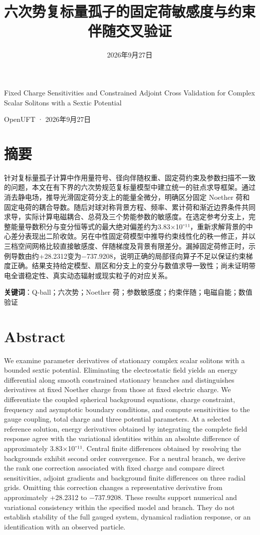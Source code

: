 \documentclass[UTF8,fontset=fandol,11pt]{ctexart}
\title{六次势复标量孤子的固定荷敏感度与约束伴随交叉验证}
\author{}
\date{2026年9月27日}
\begin{document}
\maketitle

Fixed Charge Sensitivities and Constrained Adjoint Cross Validation for Complex Scalar Solitons with a Sextic Potential

OpenUFT · 2026年9月27日

\section*{摘要}

针对复标量孤子计算中作用量符号、径向伴随权重、固定荷约束及参数扫描不一致的问题，本文在有下界的六次势规范复标量模型中建立统一的驻点求导框架。通过消去静电场，推导光滑固定荷分支上的能量全微分，明确区分固定 Noether 荷和固定电荷的耦合导数。随后对球对称背景方程、频率、累计荷和渐近边界条件共同求导，实际计算电磁耦合、总荷及三个势能参数的敏感度。在选定参考分支上，完整能量导数积分与变分恒等式的最大绝对偏差约为3.83×10⁻¹¹，重新求解背景的中心差分表现出二阶收敛。另在中性固定荷模型中推导约束线性化的秩一修正，并以三档空间网格比较直接敏感度、伴随梯度及背景有限差分。漏掉固定荷修正时，示例导数由约+28.2312变为−737.9208，说明正确的局部径向算子不足以保证约束梯度正确。结果支持给定模型、扇区和分支上的变分与数值求导一致性；尚未证明带电全谱稳定性、真实动态辐射或现实粒子的对应关系。

\textbf{关键词}：Q-ball；六次势；Noether 荷；参数敏感度；约束伴随；电磁自能；数值验证

\section*{Abstract}

We examine parameter derivatives of stationary complex scalar solitons with a bounded sextic potential. Eliminating the electrostatic field yields an energy differential along smooth constrained stationary branches and distinguishes derivatives at fixed Noether charge from those at fixed electric charge. We differentiate the coupled spherical background equations, charge constraint, frequency and asymptotic boundary conditions, and compute sensitivities to the gauge coupling, total charge and three potential parameters. At a selected reference solution, energy derivatives obtained by integrating the complete field response agree with the variational identities within an absolute difference of approximately 3.83×10⁻¹¹. Central finite differences obtained by resolving the backgrounds exhibit second order convergence. For a neutral branch, we derive the rank one correction associated with fixed charge and compare direct sensitivities, adjoint gradients and background finite differences on three radial grids. Omitting this correction changes a representative derivative from approximately +28.2312 to −737.9208. These results support numerical and variational consistency within the specified model and branch. They do not establish stability of the full gauged system, dynamical radiation response, or an identification with an observed particle.
\end{document}

